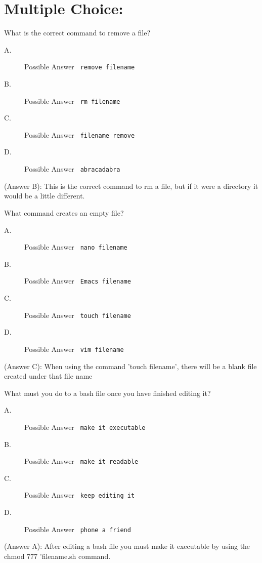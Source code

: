 \documentclass[12pt,answers]{exam}
\begin{document}
\section*{Multiple Choice:} 
\begin{questions}
 
\question What is the correct command to remove a file? 
\begin{description} 
\item[A.] Possible Answer \verb' remove filename' 
\item[B.] Possible Answer \verb' rm filename' 
\item[C.] Possible Answer \verb' filename remove' 
\item[D.] Possible Answer \verb' abracadabra' 
\end{description} 
\begin{solution} 
(Answer B): This is the correct command to rm a file, but if it were a directory it would be a little different. 
\end{solution} 
 
\question What command creates an empty file? 
\begin{description} 
\item[A.] Possible Answer \verb' nano filename' 
\item[B.] Possible Answer \verb' Emacs filename' 
\item[C.] Possible Answer \verb' touch filename' 
\item[D.] Possible Answer \verb' vim filename' 
\end{description} 
\begin{solution} 
(Answer C): When using the command 'touch filename', there will be a blank file created under that file name 
\end{solution}
 
\question What must you do to a bash file once you have finished editing it? 
\begin{description} 
\item[A.] Possible Answer \verb' make it executable' 
\item[B.] Possible Answer \verb' make it readable' 
\item[C.] Possible Answer \verb' keep editing it' 
\item[D.] Possible Answer \verb' phone a friend' 
\end{description} 
\begin{solution} 
(Answer A): After editing a bash file you must make it executable by using the chmod 777 'filename.sh command. 
\end{solution}
  

\end{questions}
\end{document}
